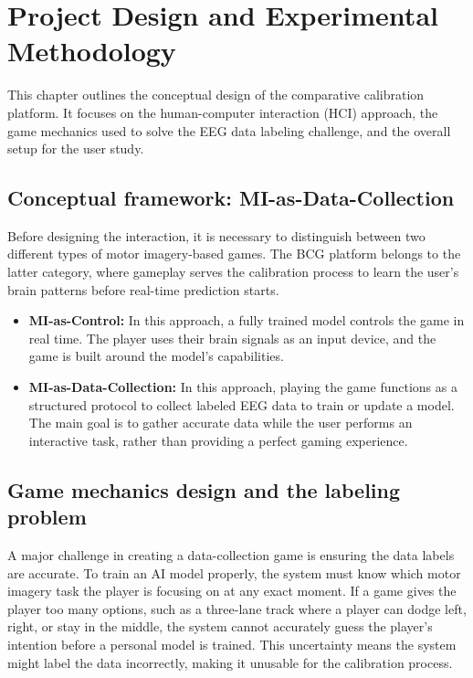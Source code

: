 \documentclass[a4paper, 11pt, openany]{report}
\begin{document}
\chapter{Project Design and Experimental Methodology}
    This chapter outlines the conceptual design of the comparative calibration platform. It focuses on the human-computer interaction (HCI) approach, the game mechanics used to solve the EEG data labeling challenge, and the overall setup for the user study.


    \section{Conceptual framework: MI-as-Data-Collection}
    
    Before designing the interaction, it is necessary to distinguish between two different types of motor imagery-based games. The BCG platform belongs to the latter category, where gameplay serves the calibration process to learn the user's brain patterns before real-time prediction starts.

    \begin{itemize}
        \item \textbf{MI-as-Control:} In this approach, a fully trained model controls the game in real time. The player uses their brain signals as an input device, and the game is built around the model's capabilities.

        \item \textbf{MI-as-Data-Collection:} In this approach, playing the game functions as a structured protocol to collect labeled EEG data to train or update a model. The main goal is to gather accurate data while the user performs an interactive task, rather than providing a perfect gaming experience.
    \end{itemize}


    \section{Game mechanics design and the labeling problem}
    
    A major challenge in creating a data-collection game is ensuring the data labels are accurate. To train an AI model properly, the system must know which motor imagery task the player is focusing on at any exact moment. If a game gives the player too many options, such as a three-lane track where a player can dodge left, right, or stay in the middle, the system cannot accurately guess the player's intention before a personal model is trained. This uncertainty means the system might label the data incorrectly, making it unusable for the calibration process.
\end{document}
